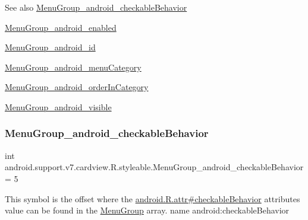 \begin{DoxySeeAlso}{See also}
\hyperlink{classandroid_1_1support_1_1v7_1_1cardview_1_1R_1_1styleable_a47c0a1dd97fa43be472968afe500af28}{Menu\+Group\+\_\+android\+\_\+checkable\+Behavior} 

\hyperlink{classandroid_1_1support_1_1v7_1_1cardview_1_1R_1_1styleable_a4195a921bff15fe1e37ecda8bce29889}{Menu\+Group\+\_\+android\+\_\+enabled} 

\hyperlink{classandroid_1_1support_1_1v7_1_1cardview_1_1R_1_1styleable_ae63e63deefe7da406c1ca9fb9da2b287}{Menu\+Group\+\_\+android\+\_\+id} 

\hyperlink{classandroid_1_1support_1_1v7_1_1cardview_1_1R_1_1styleable_a9b40234702a38415a4aa0fd579147bc7}{Menu\+Group\+\_\+android\+\_\+menu\+Category} 

\hyperlink{classandroid_1_1support_1_1v7_1_1cardview_1_1R_1_1styleable_aef91bfa862344302a0155c4e3ba835ff}{Menu\+Group\+\_\+android\+\_\+order\+In\+Category} 

\hyperlink{classandroid_1_1support_1_1v7_1_1cardview_1_1R_1_1styleable_ae7d9cea3e094885fafcecd55addf2ff0}{Menu\+Group\+\_\+android\+\_\+visible} 
\end{DoxySeeAlso}
\mbox{\label{classandroid_1_1support_1_1v7_1_1cardview_1_1R_1_1styleable_a47c0a1dd97fa43be472968afe500af28}} 
\subsubsection{\texorpdfstring{Menu\+Group\+\_\+android\+\_\+checkable\+Behavior}{MenuGroup\_android\_checkableBehavior}}
{\footnotesize\ttfamily int android.\+support.\+v7.\+cardview.\+R.\+styleable.\+Menu\+Group\+\_\+android\+\_\+checkable\+Behavior = 5\hspace{0.3cm}{\ttfamily [static]}}

This symbol is the offset where the \hyperlink{}{android.\+R.\+attr\#checkable\+Behavior} attribute\textquotesingle{}s value can be found in the \hyperlink{classandroid_1_1support_1_1v7_1_1cardview_1_1R_1_1styleable_aec12064c9ec8c2dea3c20674737c17ed}{Menu\+Group} array.  name android\+:checkable\+Behavior \mbox{\label{classandroid_1_1support_1_1v7_1_1cardview_1_1R_1_1styleable_a4195a921bff15fe1e37ecda8bce29889}} 
